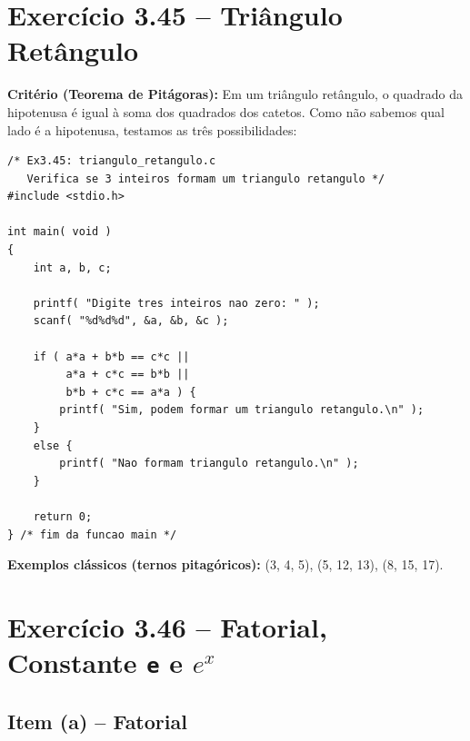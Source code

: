 \documentclass[12pt,a4paper]{article}
\begin{document}
\section{Exercício 3.45 -- Triângulo Retângulo}

\begin{respostabox}
\textbf{Critério (Teorema de Pitágoras):} Em um triângulo retângulo, o quadrado da
hipotenusa é igual à soma dos quadrados dos catetos. Como não sabemos qual lado é a
hipotenusa, testamos as três possibilidades:

\begin{lstlisting}
/* Ex3.45: triangulo_retangulo.c
   Verifica se 3 inteiros formam um triangulo retangulo */
#include <stdio.h>

int main( void )
{
    int a, b, c;

    printf( "Digite tres inteiros nao zero: " );
    scanf( "%d%d%d", &a, &b, &c );

    if ( a*a + b*b == c*c ||
         a*a + c*c == b*b ||
         b*b + c*c == a*a ) {
        printf( "Sim, podem formar um triangulo retangulo.\n" );
    }
    else {
        printf( "Nao formam triangulo retangulo.\n" );
    }

    return 0;
} /* fim da funcao main */
\end{lstlisting}

\textbf{Exemplos clássicos (ternos pitagóricos):} (3, 4, 5), (5, 12, 13), (8, 15, 17).
\end{respostabox}

\newpage

\section{Exercício 3.46 -- Fatorial, Constante \texttt{e} e $e^x$}

\subsection*{Item (a) -- Fatorial}
\end{document}
